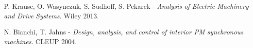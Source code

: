 \documentclass[11pt,a4paper]{article}
\numberwithin{equation}{section}
\theoremstyle{it}
\theoremstyle{definition}
\begin{document}
\begin{onehalfspace}
\begin{thebibliography}{99}

	 P. Krause, O. Wasynczuk, S. Sudhoff, S. Pekarek - \textit{Analysis of Electric Machinery and Drive Systems}. Wiley 2013.
			
	 N. Bianchi, T. Jahns - \textit{Design, analysis, and control of interior PM synchronous machines}. CLEUP 2004.
	
\end{thebibliography}
\end{onehalfspace}
\end{document}
